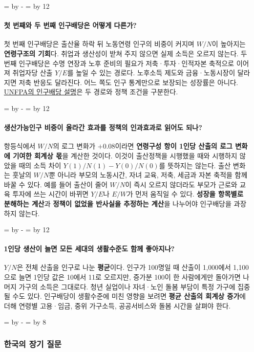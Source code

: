 \documentclass[10pt,a4paper]{article}
\newcommand{\ReserveQuestionSpace}{%
  \par\begingroup
  \dimen0=\pagegoal \advance\dimen0 by -\pagetotal
  \dimen2=\baselineskip \multiply\dimen2 by 12
  \ifdim\dimen0<\dimen2 \newpage\fi
  \endgroup}
\newcommand{\ReserveReadingSectionSpace}{%
  \par\begingroup
  \dimen0=\pagegoal \advance\dimen0 by -\pagetotal
  \dimen2=\baselineskip \multiply\dimen2 by 8
  \ifdim\dimen0<\dimen2 \newpage\fi
  \endgroup}
\begin{document}
\ReserveQuestionSpace
\paragraph{첫 번째와 두 번째 인구배당은 어떻게 다른가?}
첫 번째 인구배당은 출산율 하락 뒤 노동연령 인구의 비중이 커지며 $W/N$이 높아지는 \textbf{연령구조의 기회}다. 취업과 생산성이 받쳐 주지 않으면 실제 소득은 오르지 않는다. 두 번째 인구배당은 수명 연장과 노후 준비의 필요가 저축·투자·인적자본 축적으로 이어져 취업자당 산출 $Y/E$를 높일 수 있는 경로다. 노후소득 제도와 금융·노동시장이 달라지면 저축 반응도 달라진다. 어느 쪽도 인구 통계만으로 보장되는 성장률은 아니다. \href{https://bangladesh.unfpa.org/en/topics/demographic-dividend}{UNFPA의 인구배당 설명}은 두 경로와 정책 조건을 구분한다.\par

\ReserveQuestionSpace
\paragraph{생산가능인구 비중이 올라간 효과를 정책의 인과효과로 읽어도 되나?}
항등식에서 $W/N$의 로그 변화가 $+0.08$이라면 \textbf{연령구성 항이 1인당 산출의 로그 변화에 기여한 회계상 몫}을 계산한 것이다. 이것이 출산정책을 시행했을 때와 시행하지 않았을 때의 소득 차이 $Y(1)/N(1)-Y(0)/N(0)$를 뜻하지는 않는다. 출산 변화는 훗날의 $W/N$뿐 아니라 부모의 노동시간, 자녀 교육, 저축, 세금과 자본 축적을 함께 바꿀 수 있다. 예를 들어 출산이 줄어 $W/N$이 즉시 오르지 않더라도 부모가 근로와 교육 투자에 쓰는 시간이 바뀌면 $Y/E$나 $E/W$가 먼저 움직일 수 있다. \textbf{성장을 항목별로 분해하는 계산}과 \textbf{정책이 없었을 반사실을 추정하는 계산}을 나누어야 인구배당을 과장하지 않는다.\par

\ReserveQuestionSpace
\paragraph{1인당 생산이 늘면 모든 세대의 생활수준도 함께 좋아지나?}
$Y/N$은 전체 산출을 인구로 나눈 \textbf{평균}이다. 인구가 100명일 때 산출이 1,000에서 1,100으로 늘면 1인당 값은 10에서 11로 오르지만, 증가분 100이 한 사람에게만 돌아가면 나머지 가구의 소득은 그대로다. 청년 실업이나 자녀·노인 돌봄 부담이 특정 가구에 집중될 수도 있다. 인구배당이 생활수준에 미친 영향을 보려면 \textbf{평균 산출의 회계상 증가}에 더해 연령별 고용·임금, 중위 가구소득, 공공서비스와 돌봄 시간을 살펴야 한다.\par

\ReserveReadingSectionSpace
\subsubsection*{한국의 장기 질문}
\end{document}
